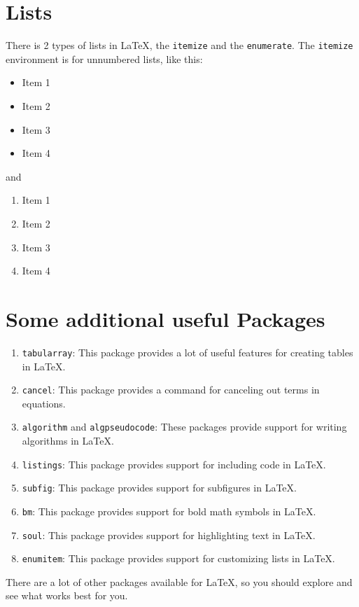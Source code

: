 \documentclass{article}
\begin{document}
\section{Lists}
There is 2 types of lists in \LaTeX, the \texttt{itemize} and the \texttt{enumerate}. The \texttt{itemize} environment is for unnumbered lists, like this:

\begin{itemize}
    \item Item 1
    \item Item 2
    \item Item 3
    \item Item 4
\end{itemize}   
and 
\begin{enumerate}
    \item Item 1
    \item Item 2
    \item Item 3
    \item Item 4
\end{enumerate}
\section{Some additional useful Packages}
\begin{enumerate}
    \item \texttt{tabularray}: This package provides a lot of useful features for creating tables in \LaTeX.
    \item \texttt{cancel}: This package provides a command for canceling out terms in equations.
    \item \texttt{algorithm} and {\texttt{algpseudocode}}: These packages provide support for writing algorithms in \LaTeX.
    \item \texttt{listings}: This package provides support for including code in \LaTeX.
    \item \texttt{subfig}: This package provides support for subfigures in \LaTeX.
    \item \texttt{bm}: This package provides support for bold math symbols in \LaTeX.
    \item \texttt{soul}: This package provides support for highlighting text in \LaTeX.
    \item \texttt{enumitem}: This package provides support for customizing lists in \LaTeX.
\end{enumerate}
There are a lot of other packages available for \LaTeX, so you should explore and see what works best for you.
\end{document}
